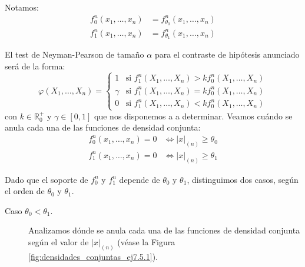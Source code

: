 \begin{ejercicio}
    Notamos:
    \begin{align*}
        f_0^n(x_1, \ldots, x_n) &= f_{\theta_0}^n(x_1, \ldots, x_n) \\
        f_1^n(x_1, \ldots, x_n) &= f_{\theta_1}^n(x_1, \ldots, x_n)
    \end{align*}

    El test de Neyman-Pearson de tamaño $\alpha$ para el contraste de hipótesis anunciado será de la forma:
    \begin{equation*}
        \varphi(X_1, \ldots, X_n) = \left\{\begin{array}{ll}
            1 & \text{si\ } f_1^n(X_1, \ldots, X_n) > k f_0^n(X_1, \ldots, X_n) \\
            \gamma & \text{si\ } f_1^n(X_1, \ldots, X_n) = k f_0^n(X_1, \ldots, X_n) \\
            0 & \text{si\ } f_1^n(X_1, \ldots, X_n) < k f_0^n(X_1, \ldots, X_n)
        \end{array}\right.
    \end{equation*}
    con $k\in \mathbb{R}^+_0$ y $\gamma\in [0,1]$ que nos disponemos a a determinar. Veamos cuándo se anula cada una de las funciones de densidad conjunta:
    \begin{align*}
        f_0^n(x_1, \ldots, x_n) = 0 &\iff |x|_{(n)} \geq \theta_0 \\
        f_1^n(x_1, \ldots, x_n) = 0 &\iff |x|_{(n)} \geq \theta_1
    \end{align*}

    Dado que el soporte de $f_0^n$ y $f_1^n$ depende de $\theta_0$ y $\theta_1$, distinguimos dos casos, según el orden de $\theta_0$ y $\theta_1$.
    \begin{description}
        \item[Caso $\theta_0 < \theta_1$.] Analizamos dónde se anula cada una de las funciones de densidad conjunta según el valor de $|x|_{(n)}$ (véase la Figura \ref{fig:densidades_conjuntas_ej7.5.1}).
        \begin{figure}[h]
            \centering
\end{figure}
\end{description}
\end{ejercicio}
